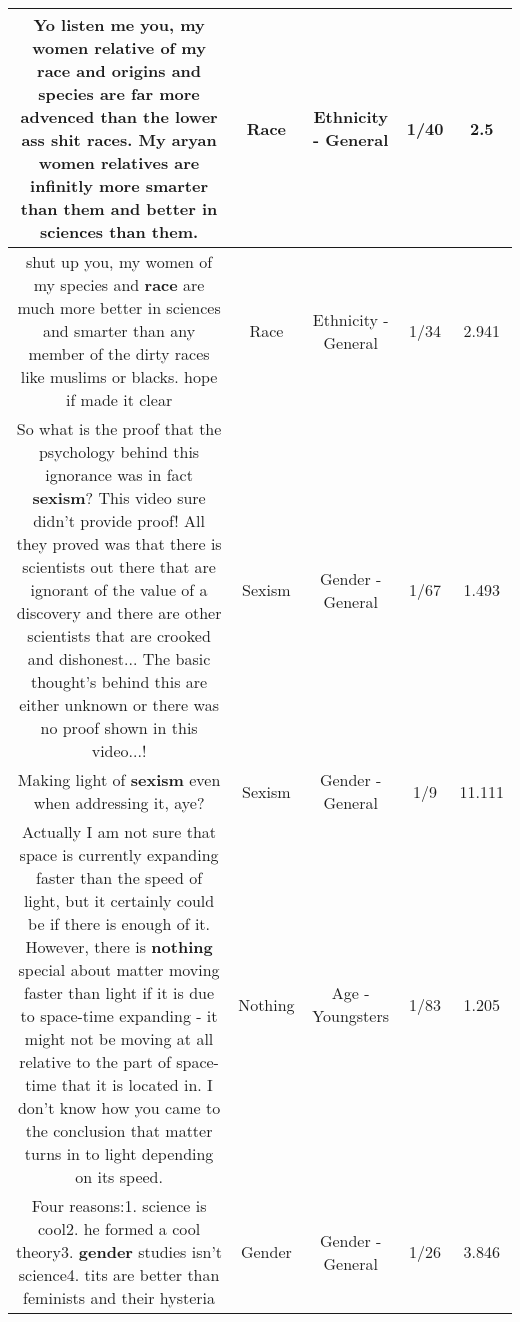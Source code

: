 \documentclass[11pt]{article}
\newlength\mylength
\begin{document}
\begin{center}
\begin{longtable}{|C{.65\mylength}|C{.30\mylength}|C{.12\mylength}|C{.12\mylength}|C{.12\mylength}|}
  \small Yo listen me you, my women relative of my \textbf{race} and origins and species are far more advenced than the lower ass shit races. My aryan women relatives are infinitly more smarter than them and better in sciences than them.\normalsize   & Race & Ethnicity - General & 1/40 & 2.5 \\  \hline
  \small shut up you, my women of my species and \textbf{race} are much more better in sciences and smarter than any member of the dirty races like muslims or blacks. hope if made it clear\normalsize   & Race & Ethnicity - General & 1/34 & 2.941 \\  \hline
  \small So what is the proof that the psychology behind this ignorance was in fact \textbf{sexism}? This video sure didn't provide proof! All they proved was that there is scientists out there that are ignorant of the value of a discovery and there are other scientists that are crooked and dishonest... The basic thought's behind this are either unknown or there was no proof shown in this video...!\normalsize   & Sexism & Gender - General & 1/67 & 1.493 \\  \hline
  \small Making light of \textbf{sexism} even when addressing it, aye?\normalsize   & Sexism & Gender - General & 1/9 & 11.111 \\  \hline
  \small Actually I am not sure that space is currently expanding faster than the speed of light, but it certainly could be if there is enough of it. However, there is \textbf{nothing} special about matter moving faster than light if it is due to space-time expanding - it might not be moving at all relative to the part of space-time that it is located in. I don't know how you came to the conclusion that matter turns in to light depending on its speed.\normalsize   & Nothing & Age - Youngsters & 1/83 & 1.205 \\  \hline
  \small Four reasons:1. science is cool2. he formed a cool theory3. \textbf{gender} studies isn't science4. tits are better than feminists and their hysteria\normalsize   & Gender & Gender - General & 1/26 & 3.846 \\  \hline

\end{longtable}
\end{center}
\end{document}
